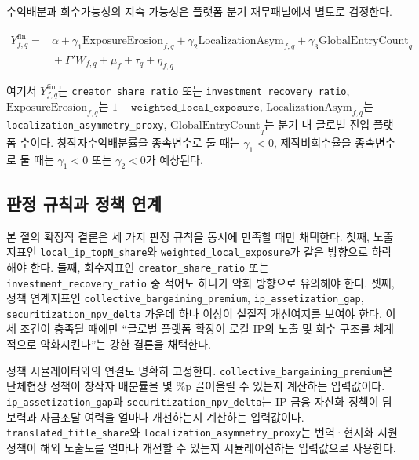\documentclass[11pt,a4paper]{report}
\begin{document}
수익배분과 회수가능성의 지속 가능성은 플랫폼-분기 재무패널에서 별도로 검정한다.

\begin{equation}
\label{eq:webtoon_finance_panel}
\begin{aligned}
Y_{f,q}^{\mathrm{fin}} ={}& \alpha + \gamma_1 \mathrm{ExposureErosion}_{f,q} + \gamma_2 \mathrm{LocalizationAsym}_{f,q} + \gamma_3 \mathrm{GlobalEntryCount}_{q} \\
& {}+ \Gamma' W_{f,q} + \mu_f + \tau_q + \eta_{f,q}
\end{aligned}
\end{equation}

여기서 $Y_{f,q}^{\mathrm{fin}}$는 \texttt{creator\_share\_ratio} 또는 \texttt{investment\_recovery\_ratio}, $\mathrm{ExposureErosion}_{f,q}$는 $1-\texttt{weighted\_local\_exposure}$, $\mathrm{LocalizationAsym}_{f,q}$는 \nolinkurl{localization_asymmetry_proxy}, $\mathrm{GlobalEntryCount}_{q}$는 분기 내 글로벌 진입 플랫폼 수이다. 창작자수익배분률을 종속변수로 둘 때는 $\gamma_1 < 0$, 제작비회수율을 종속변수로 둘 때는 $\gamma_1 < 0$ 또는 $\gamma_2 < 0$가 예상된다.

\subsection{판정 규칙과 정책 연계}
본 절의 확정적 결론은 세 가지 판정 규칙을 동시에 만족할 때만 채택한다. 첫째, 노출지표인 \texttt{local\_ip\_topN\_share}와 \texttt{weighted\_local\_exposure}가 같은 방향으로 하락해야 한다. 둘째, 회수지표인 \texttt{creator\_share\_ratio} 또는 \texttt{investment\_recovery\_ratio} 중 적어도 하나가 악화 방향으로 유의해야 한다. 셋째, 정책 연계지표인 \nolinkurl{collective_bargaining_premium}, \texttt{ip\_assetization\_gap}, \texttt{securitization\_npv\_delta} 가운데 하나 이상이 실질적 개선여지를 보여야 한다. 이 세 조건이 충족될 때에만 ``글로벌 플랫폼 확장이 로컬 IP의 노출 및 회수 구조를 체계적으로 악화시킨다''는 강한 결론을 채택한다.

정책 시뮬레이터와의 연결도 명확히 고정한다. \nolinkurl{collective_bargaining_premium}은 단체협상 정책이 창작자 배분률을 몇 \%p 끌어올릴 수 있는지 계산하는 입력값이다. \texttt{ip\_assetization\_gap}과 \texttt{securitization\_npv\_delta}는 IP 금융 자산화 정책이 담보력과 자금조달 여력을 얼마나 개선하는지 계산하는 입력값이다. \texttt{translated\_title\_share}와 \nolinkurl{localization_asymmetry_proxy}는 번역·현지화 지원정책이 해외 노출도를 얼마나 개선할 수 있는지 시뮬레이션하는 입력값으로 사용한다.
\end{document}
